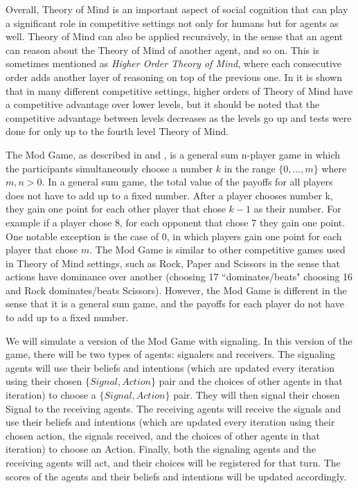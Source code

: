 Overall, Theory of Mind is an important aspect of social cognition that can play a significant role in competitive settings not only for humans but for agents as well. Theory of Mind can also be applied recursively, in the sense that an agent can reason about the Theory of Mind of another agent, and so on. This is sometimes mentioned as \textit{Higher Order Theory of Mind}, where each consecutive order adds another layer of reasoning on top of the previous one. In \cite{de2013much} it is shown that in many different competitive settings, higher orders of Theory of Mind have a competitive advantage over lower levels, but it should be noted that the competitive advantage between levels decreases as the levels go up and tests were done for only up to the fourth level Theory of Mind.

The Mod Game, as described in \cite{frey2013cyclic} and \cite{veltman2019training}, is a general sum n-player game in which the participants simultaneously choose a number $k$ in the range $\{0, …, m\}$ where $m, n > 0$. In a general sum game, the total value of the payoffs for all players does not have to add up to a fixed number. After a player chooses number k, they gain one point for each other player that chose $k - 1$ as their number. For example if a player chose 8, for each opponent that chose 7 they gain one point. One notable exception is the case of 0, in which players gain one point for each player that chose $m$. The Mod Game is similar to other competitive games used in Theory of Mind settings, such as Rock, Paper and Scissors in the sense that actions have dominance over another (choosing 17 ``dominates/beats" choosing 16 and Rock dominates/beats Scissors). However, the Mod Game is different in the sense that it is a general sum game, and the payoffs for each player do not have to add up to a fixed number.

We will simulate a version of the Mod Game with signaling. In this version of the game, there will be two types of agents: signalers and receivers. The signaling agents will use their beliefs and intentions (which are updated every iteration using their chosen $\{Signal, Action\}$ pair and the choices of other agents in that iteration) to choose a $\{Signal, Action\}$ pair. They will then signal their chosen Signal to the receiving agents. The receiving agents will receive the signals and use their beliefs and intentions (which are updated every iteration using their chosen action, the signals received, and the choices of other agents in that iteration) to choose an Action. Finally, both the signaling agents and the receiving agents will act, and their choices will be registered for that turn. The scores of the agents and their beliefs and intentions will be updated accordingly.

